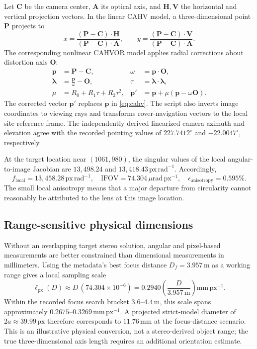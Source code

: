 \documentclass[11pt,letterpaper]{article}
\newcommand{\px}{\,\mathrm{px}}
\newcommand{\mat}[1]{\mathbf{#1}}
\begin{document}
Let \(\mat C\) be the camera center, \(\mat A\) its optical axis, and \(\mat H,\mat V\) the horizontal and vertical projection vectors. In the linear CAHV model, a three-dimensional point \(\mat P\) projects to
\begin{equation}
 x=\frac{(\mat P-\mat C)\cdot\mat H}{(\mat P-\mat C)\cdot\mat A},\qquad
 y=\frac{(\mat P-\mat C)\cdot\mat V}{(\mat P-\mat C)\cdot\mat A}.
 \label{eq:cahv}
\end{equation}
The corresponding nonlinear CAHVOR model applies radial corrections about distortion axis \(\mat O\):
\begin{align}
\mat p&=\mat P-\mat C, & \omega&=\mat p\cdot\mat O, \\
\boldsymbol{\lambda}&=\frac{\mat p}{\omega}-\mat O, & \tau&=\boldsymbol{\lambda}\cdot\boldsymbol{\lambda},\\
\mu&=R_0+R_1\tau+R_2\tau^2, &
\mat p'&=\mat p+\mu(\mat p-\omega\mat O).
\end{align}
The corrected vector \(\mat p'\) replaces \(\mat p\) in \cref{eq:cahv}. The script also inverts image coordinates to viewing rays and transforms rover-navigation vectors to the local site reference frame. The independently derived linearized camera azimuth and elevation agree with the recorded pointing values of \(227.7412^\circ\) and \(-22.0047^\circ\), respectively.

At the target location near \((1061,980)\), the singular values of the local angular-to-image Jacobian are \(13{,}498.24\) and \(13{,}418.43\,\mathrm{px\,rad^{-1}}\). Accordingly,
\begin{equation}
 f_{\mathrm{local}}=13{,}458.28\,\mathrm{px\,rad^{-1}},\quad
 \mathrm{IFOV}=74.304\,\mu\mathrm{rad\,px^{-1}},\quad
 \epsilon_{\mathrm{anisotropy}}=0.595\%.
\end{equation}
The small local anisotropy means that a major departure from circularity cannot reasonably be attributed to the lens at this image location.

\subsection{Range-sensitive physical dimensions}

Without an overlapping target stereo solution, angular and pixel-based measurements are better constrained than dimensional measurements in millimeters. Using the metadata's best focus distance \(D_f=3.957\,\mathrm{m}\) as a working range gives a local sampling scale
\begin{equation}
 \ell_{\mathrm{px}}(D)\approx D\,(74.304\times10^{-6})
 = 0.2940\left(\frac{D}{3.957\,\mathrm m}\right)\mathrm{mm\,px^{-1}}.
 \label{eq:scale}
\end{equation}
Within the recorded focus search bracket \(3.6\)--\(4.4\,\mathrm m\), this scale spans approximately \(0.2675\)--\(0.3269\,\mathrm{mm\,px^{-1}}\). A projected strict-model diameter of \(2a\approx39.99\px\) therefore corresponds to \(11.76\,\mathrm{mm}\) at the focus-distance scenario. This is an illustrative physical conversion, not a stereo-derived object range; the true three-dimensional axis length requires an additional orientation estimate.
\end{document}
